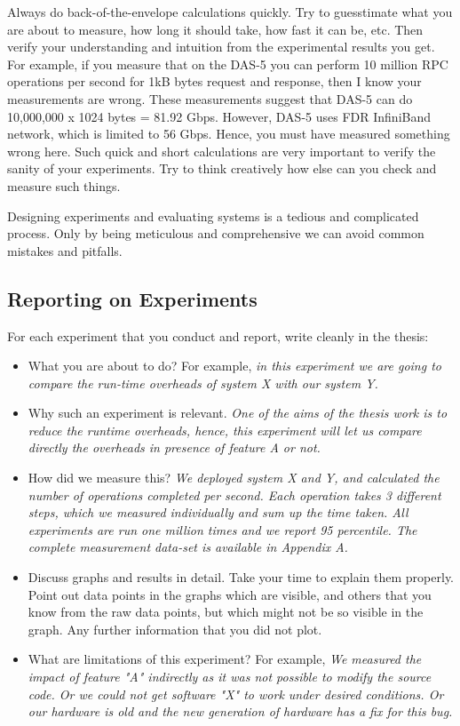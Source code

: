 \documentclass[11pt]{article}
\begin{document}
Always do back-of-the-envelope calculations quickly. Try to guesstimate what you are about to measure, how long it should take, how fast it can be, etc. Then verify your understanding and intuition from the experimental results you get. For example, if you measure that on the DAS-5 you can perform 10 million RPC operations per second for 1kB bytes request and response, then I know your measurements are wrong. These measurements suggest that DAS-5 can do 10,000,000 x 1024 bytes = 81.92 Gbps. However, DAS-5 uses FDR InfiniBand network, which is limited to 56 Gbps. Hence, you must have measured something wrong here. Such quick and short calculations are very important to verify the sanity of your experiments. Try to think creatively how else can you check and measure such things. 


Designing experiments and evaluating systems is a tedious and complicated process. Only by being meticulous and comprehensive we can avoid common mistakes and pitfalls. 

\subsection*{Reporting on Experiments} 
For each experiment that you conduct and report, write cleanly in the thesis: 
\begin{itemize}
    \item What you are about to do? For example, \textit {in this experiment we are going to compare the run-time overheads of system X with our system Y.} 
    \item Why such an experiment is relevant. \textit{One of the aims of the thesis work is to reduce the runtime overheads, hence, this experiment will let us compare directly the overheads in presence of feature A or not.}
    \item How did we measure this? \textit{We deployed system X and Y, and calculated the number of operations completed per second. Each operation takes 3 different steps, which we measured individually and sum up the time taken. All experiments are run one million times and we report 95 percentile. The complete measurement data-set is available in Appendix A.}
    \item Discuss graphs and results in detail. Take your time to explain them properly. Point out data points in the graphs which are visible, and others that you know from the raw data points, but which might not be so visible in the graph. Any further information that you did not plot. 
    \item What are limitations of this experiment? For example, \textit{ We measured the impact of feature "A" indirectly as it was not possible to modify the source code. Or we could not get software "X" to work under desired conditions. Or our hardware is old and the new generation of hardware has a fix for this bug.}
\end{itemize}
\end{document}
